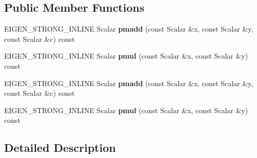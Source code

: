 \subsection*{Public Member Functions}
\begin{DoxyCompactItemize}
\item 
\mbox{\label{struct_eigen_1_1internal_1_1conj__helper_3_01std_1_1complex_3_01_real_scalar_01_4_00_01std_1_1co17cad1c9f1dd5f8fd2568a2fb541b29b_a8bd1e153ba5606648c963500f7a9616c}} 
E\+I\+G\+E\+N\+\_\+\+S\+T\+R\+O\+N\+G\+\_\+\+I\+N\+L\+I\+NE Scalar {\bfseries pmadd} (const Scalar \&x, const Scalar \&y, const Scalar \&c) const
\item 
\mbox{\label{struct_eigen_1_1internal_1_1conj__helper_3_01std_1_1complex_3_01_real_scalar_01_4_00_01std_1_1co17cad1c9f1dd5f8fd2568a2fb541b29b_a2d63f500d2bf2b2c0ba3ca9004349559}} 
E\+I\+G\+E\+N\+\_\+\+S\+T\+R\+O\+N\+G\+\_\+\+I\+N\+L\+I\+NE Scalar {\bfseries pmul} (const Scalar \&x, const Scalar \&y) const
\item 
\mbox{\label{struct_eigen_1_1internal_1_1conj__helper_3_01std_1_1complex_3_01_real_scalar_01_4_00_01std_1_1co17cad1c9f1dd5f8fd2568a2fb541b29b_a8bd1e153ba5606648c963500f7a9616c}} 
E\+I\+G\+E\+N\+\_\+\+S\+T\+R\+O\+N\+G\+\_\+\+I\+N\+L\+I\+NE Scalar {\bfseries pmadd} (const Scalar \&x, const Scalar \&y, const Scalar \&c) const
\item 
\mbox{\label{struct_eigen_1_1internal_1_1conj__helper_3_01std_1_1complex_3_01_real_scalar_01_4_00_01std_1_1co17cad1c9f1dd5f8fd2568a2fb541b29b_a2d63f500d2bf2b2c0ba3ca9004349559}} 
E\+I\+G\+E\+N\+\_\+\+S\+T\+R\+O\+N\+G\+\_\+\+I\+N\+L\+I\+NE Scalar {\bfseries pmul} (const Scalar \&x, const Scalar \&y) const
\end{DoxyCompactItemize}


\subsection{Detailed Description}
